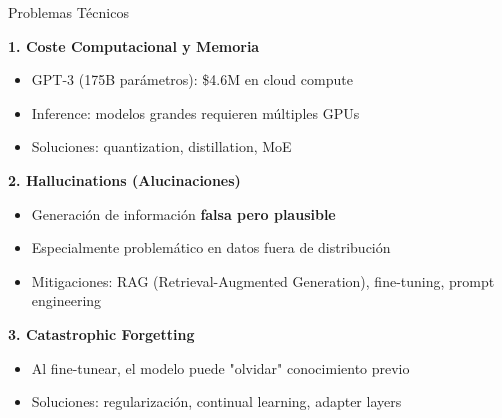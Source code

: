 \begin{frame}{Problemas Técnicos}

\textbf{1. Coste Computacional y Memoria}
\begin{itemize}
    \item GPT-3 (175B parámetros): \$4.6M en cloud compute
    \item Inference: modelos grandes requieren múltiples GPUs
    \item Soluciones: quantization, distillation, MoE
\end{itemize}

\vspace{0.5em}

\textbf{2. Hallucinations (Alucinaciones)}
\begin{itemize}
    \item Generación de información \textbf{falsa pero plausible}
    \item Especialmente problemático en datos fuera de distribución
    \item Mitigaciones: RAG (Retrieval-Augmented Generation), fine-tuning, prompt engineering
\end{itemize}

\vspace{0.5em}

\textbf{3. Catastrophic Forgetting}
\begin{itemize}
    \item Al fine-tunear, el modelo puede "olvidar" conocimiento previo
    \item Soluciones: regularización, continual learning, adapter layers
\end{itemize}

\end{frame}

